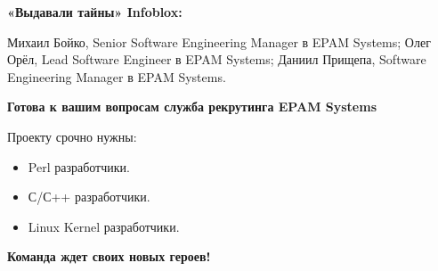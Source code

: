 \documentclass[10pt, a5paper]{article}
\begin{document}
\textbf{«Выдавали тайны» Infoblox:}

\noindent Михаил Бойко, Senior Software Engineering Manager в EPAM Systems;
Олег Орёл,  Lead Software Engineer в EPAM Systems;
Даниил Прищепа, Software Engineering Manager в EPAM Systems.



\textbf{Готова к вашим вопросам служба рекрутинга EPAM Systems}

Проекту срочно нужны:
\begin{itemize}
\item Perl разработчики.
\item С/С++ разработчики.
\item Linux Kernel разработчики.
\end{itemize}


\textbf{Команда ждет своих новых героев!}
\end{document}
